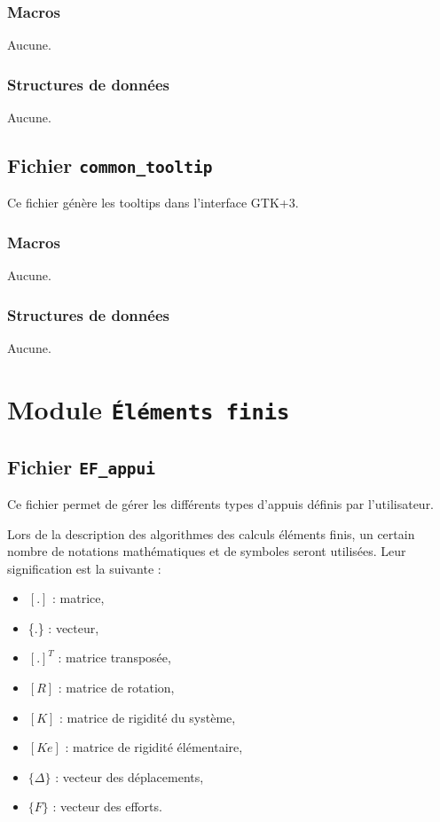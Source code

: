 \documentclass{article}
\begin{document}
\subsubsection{Macros}
Aucune.
\subsubsection{Structures de données}
Aucune.




\subsection{Fichier {\texttt{common\_tooltip}}}
Ce fichier génère les tooltips dans l'interface GTK+3.
\subsubsection{Macros}
Aucune.
\subsubsection{Structures de données}
Aucune.


\section{Module {\texttt{Éléments finis}}}
\subsection{Fichier {\texttt{EF\_appui}}}
Ce fichier permet de gérer les différents types d'appuis définis par l'utilisateur.\par
Lors de la description des algorithmes des calculs éléments finis, un certain nombre de notations mathématiques et de symboles seront utilisées. Leur signification est la suivante :
\begin{itemize}
\item $[.]$ : matrice,
\item \{.\} : vecteur,
\item $[.]^T$ : matrice transposée,
\item $[R]$ : matrice de rotation,
\item $[K]$ : matrice de rigidité du système,
\item $[Ke]$ : matrice de rigidité élémentaire,
\item $\{\Delta\}$ : vecteur des déplacements,
\item $\{F\}$ : vecteur des efforts.
\end{itemize}
\end{document}
